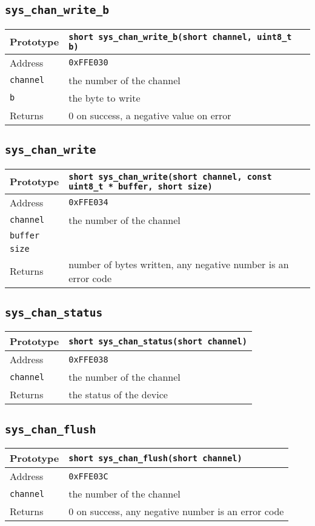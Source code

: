 \subsection*{\texttt{sys\_chan\_write\_b}}
\begin{tabular}{|l||l|} \hline
Prototype & \lstinline!short sys_chan_write_b(short channel, uint8_t b)! \\ \hline
Address & \texttt{0xFFE030} \\ \hline
\lstinline!channel! & the number of the channel \\ \hline
\lstinline!b! & the byte to write \\ \hline
Returns & 0 on success, a negative value on error \\ \hline
\end{tabular}

\subsection*{\texttt{sys\_chan\_write}}
\begin{tabular}{|l||l|} \hline
Prototype & \lstinline!short sys_chan_write(short channel, const uint8_t * buffer, short size)! \\ \hline
Address & \texttt{0xFFE034} \\ \hline
\lstinline!channel! & the number of the channel \\ \hline
\lstinline!buffer! &  \\ \hline
\lstinline!size! &  \\ \hline
Returns & number of bytes written, any negative number is an error code \\ \hline
\end{tabular}

\subsection*{\texttt{sys\_chan\_status}}
\begin{tabular}{|l||l|} \hline
Prototype & \lstinline!short sys_chan_status(short channel)! \\ \hline
Address & \texttt{0xFFE038} \\ \hline
\lstinline!channel! & the number of the channel \\ \hline
Returns & the status of the device \\ \hline
\end{tabular}

\subsection*{\texttt{sys\_chan\_flush}}
\begin{tabular}{|l||l|} \hline
Prototype & \lstinline!short sys_chan_flush(short channel)! \\ \hline
Address & \texttt{0xFFE03C} \\ \hline
\lstinline!channel! & the number of the channel \\ \hline
Returns & 0 on success, any negative number is an error code \\ \hline
\end{tabular}

